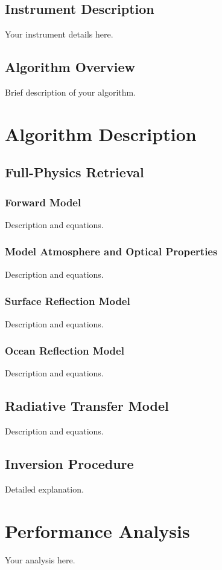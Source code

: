 \documentclass[11pt,a4paper]{article}
\begin{document}
\subsection{Instrument Description}
Your instrument details here.

\subsection{Algorithm Overview}
Brief description of your algorithm.

\section{Algorithm Description}
\subsection{Full-Physics Retrieval}
\subsubsection{Forward Model}
Description and equations.

\subsubsection{Model Atmosphere and Optical Properties}
Description and equations.

\subsubsection{Surface Reflection Model}
Description and equations.

\subsubsection{Ocean Reflection Model}
Description and equations.

\subsection{Radiative Transfer Model}
Description and equations.

\subsection{Inversion Procedure}
Detailed explanation.

\section{Performance Analysis}
Your analysis here.
\end{document}
